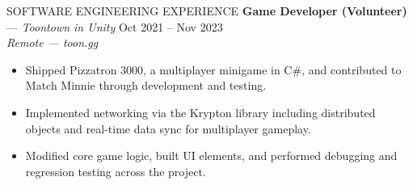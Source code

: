 \documentclass{resume}
\begin{document}
\begin{rSection}{SOFTWARE ENGINEERING EXPERIENCE}
\textbf{Game Developer (Volunteer)} --- \textit{Toontown in Unity} \hfill Oct 2021 -- Nov 2023 \\
\textit{Remote --- toon.gg}
\begin{itemize}
    \item Shipped Pizzatron 3000, a multiplayer minigame in C\#, and contributed to Match Minnie through development and testing.
    \item Implemented networking via the Krypton library including distributed objects and real-time data sync for multiplayer gameplay.
    \item Modified core game logic, built UI elements, and performed debugging and regression testing across the project.
\end{itemize}

\end{rSection}

\end{document}
